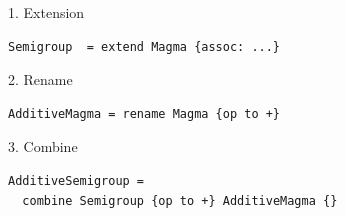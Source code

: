 \documentclass[t,10pt,numbers,fleqn,usenames,xcolor=dvipsnames]{beamer}
\begin{document}
\begin{frame}[fragile]
\begin{overprint}
\begin{columns}
\begin{column}{0.45\textwidth}
\scriptsize{1. Extension}
\begin{verbatim}
Semigroup  = extend Magma {assoc: ...}
\end{verbatim}
\vspace{0.3cm}
\scriptsize{2. Rename}
\begin{verbatim}
AdditiveMagma = rename Magma {op to +} 
\end{verbatim}
\vspace{0.3cm}
\scriptsize{3. Combine}
\begin{verbatim}
AdditiveSemigroup = 
  combine Semigroup {op to +} AdditiveMagma {} 
\end{verbatim}
\end{column}
\begin{column}{0.45\textwidth}
{\scriptsize
{}
}
\end{column}
\end{columns}
\end{overprint}
\end{frame}
\end{document}
